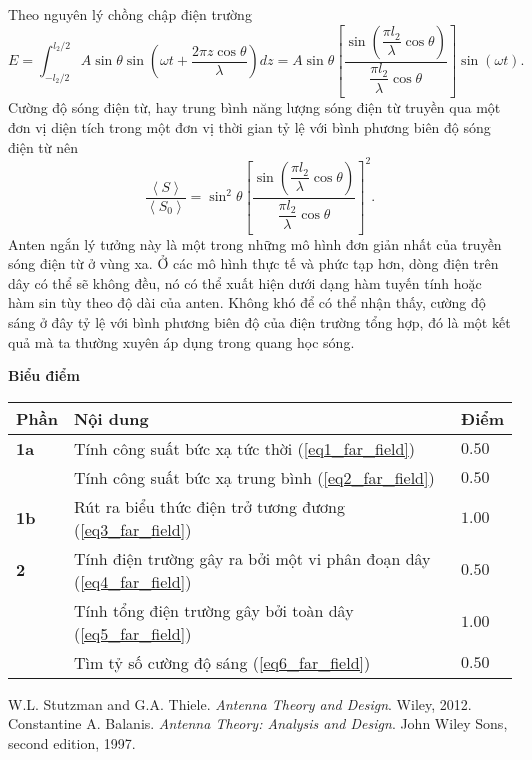 \begin{enumerate}
    Theo nguyên lý chồng chập điện trường
    \begin{equation} \label{eq5_far_field}
        E = \int_{-l_2/2}^{l_2/2} A \sin \theta \sin \left( \omega t + \dfrac{2\pi z \cos \theta}{\lambda} \right) dz = A \sin \theta \left[ \dfrac{ \sin \left( \dfrac{\pi l_2}{\lambda} \cos \theta \right)}{\dfrac{\pi l_2}{\lambda} \cos \theta} \right] \sin (\omega t).
    \end{equation}
    Cường độ sóng điện từ, hay trung bình năng lượng sóng điện từ truyền qua một đơn vị diện tích trong một đơn vị thời gian tỷ lệ với bình phương biên độ sóng điện từ nên
    \begin{equation} \label{eq6_far_field}
        \dfrac{\left< S \right>}{\left< S_0 \right>} = \sin^2 \theta \left[ \dfrac{ \sin \left( \dfrac{\pi l_2}{\lambda} \cos \theta \right)}{\dfrac{\pi l_2}{\lambda} \cos \theta} \right]^2.
    \end{equation}
    Anten ngắn lý tưởng này là một trong những mô hình đơn giản nhất của truyền sóng điện từ ở vùng xa. Ở các mô hình thực tế và phức tạp hơn, dòng điện trên dây có thể sẽ không đều, nó có thể xuất hiện dưới dạng hàm tuyến tính hoặc hàm sin tùy theo độ dài của anten. Không khó để có thể nhận thấy, cường độ sáng ở đây tỷ lệ với bình phương biên độ của điện trường tổng hợp, đó là một kết quả mà ta thường xuyên áp dụng trong quang học sóng.
\end{enumerate}

\textbf{Biểu điểm}
\begin{center}
\begin{tabular}{|>{\centering\arraybackslash}m{1cm}|>{\raggedright\arraybackslash}m{14cm}| >{\centering\arraybackslash}m{1cm}|}
    \hline
    \textbf{Phần} & \textbf{Nội dung} & \textbf{Điểm} \\
    \hline
    \textbf{1a} & Tính công suất bức xạ tức thời (\ref{eq1_far_field}) & $0.50$ \\
    \cline{2-3}
    & Tính công suất bức xạ trung bình (\ref{eq2_far_field}) & $0.50$ \\
    \hline
    \textbf{1b} & Rút ra biểu thức điện trở tương đương (\ref{eq3_far_field}) & $1.00$ \\
    \hline
    \textbf{2} & Tính điện trường gây ra bởi một vi phân đoạn dây (\ref{eq4_far_field})  & $0.50$ \\
    \cline{2-3}
    & Tính tổng điện trường gây bởi toàn dây (\ref{eq5_far_field}) & $1.00$ \\
    \cline{2-3}
    & Tìm tỷ số cường độ sáng (\ref{eq6_far_field}) & $0.50$ \\
    \hline
\end{tabular}
\end{center}


\begin{thebibliography}{}
 W.L. Stutzman and G.A. Thiele. \textit{Antenna Theory and Design}. Wiley, 2012.
 Constantine A. Balanis. \textit{Antenna Theory: Analysis and Design}. John Wiley Sons, second edition, 1997.
\end{thebibliography}